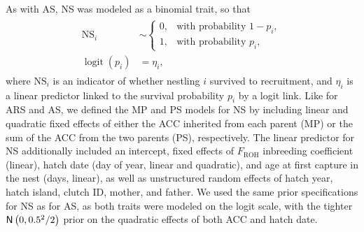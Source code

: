 \documentclass[dvipsnames]{article}
\begin{document}
As with AS, NS was modeled as a binomial trait, so that
\begin{align}
\begin{split}
\label{eq-ns}
\mathrm{NS}_{i} &\sim
\begin{cases}
0, & \text{with probability } 1 - p_{i},\\[-10pt]
1, & \text{with probability } p_{i},
\end{cases}
\\[-5pt]
\operatorname{logit}(p_{i}) &= \eta_{i},
\end{split}
\end{align}
where $\mathrm{NS}_i$ is an indicator of whether nestling $i$ survived to recruitment, and $\eta_i$ is a linear predictor linked to the survival probability $p_i$ by a logit link.
Like for ARS and AS, we defined the MP and PS models for NS by including linear and quadratic fixed effects of either the ACC inherited from each parent (MP) or the sum of the ACC from the two parents (PS), respectively.
The linear predictor for NS additionally included an intercept, fixed effects of $F_\text{ROH}$ inbreeding coefficient (linear), hatch date (day of year, linear and quadratic), and age at first capture in the nest (days, linear), as well as unstructured random effects of hatch year, hatch island, clutch ID, mother, and father.
We used the same prior specifications for NS as for AS, as both traits were modeled on the logit scale, with the tighter $\mathsf{N}\left(0, 0.5^2/2\right)$ prior on the quadratic effects of both ACC and hatch date.
\end{document}
